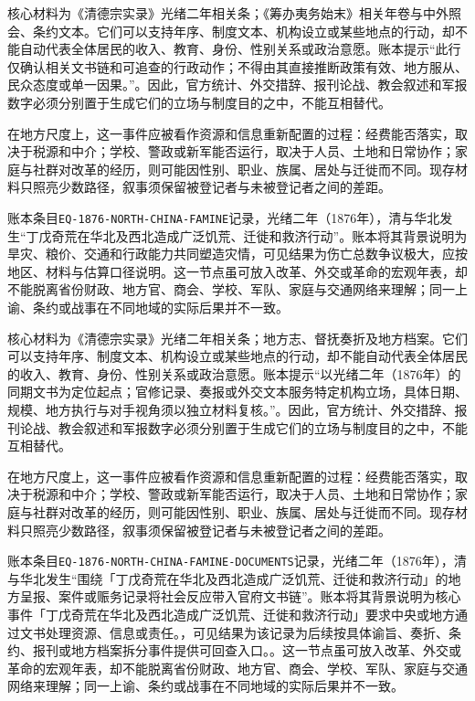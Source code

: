 核心材料为《清德宗实录》光绪二年相关条；《筹办夷务始末》相关年卷与中外照会、条约文本。它们可以支持年序、制度文本、机构设立或某些地点的行动，却不能自动代表全体居民的收入、教育、身份、性别关系或政治意愿。账本提示“此行仅确认相关文书链和可追查的行政动作；不得由其直接推断政策有效、地方服从、民众态度或单一因果。”。因此，官方统计、外交措辞、报刊论战、教会叙述和军报数字必须分别置于生成它们的立场与制度目的之中，不能互相替代。

在地方尺度上，这一事件应被看作资源和信息重新配置的过程：经费能否落实，取决于税源和中介；学校、警政或新军能否运行，取决于人员、土地和日常协作；家庭与社群对改革的经历，则可能因性别、职业、族属、居处与迁徙而不同。现存材料只照亮少数路径，叙事须保留被登记者与未被登记者之间的差距。

账本条目\texttt{EQ-1876-NORTH-CHINA-FAMINE}记录，光绪二年（1876年），清与华北发生“丁戊奇荒在华北及西北造成广泛饥荒、迁徙和救济行动”。账本将其背景说明为旱灾、粮价、交通和行政能力共同塑造灾情，可见结果为伤亡总数争议极大，应按地区、材料与估算口径说明。这一节点虽可放入改革、外交或革命的宏观年表，却不能脱离省份财政、地方官、商会、学校、军队、家庭与交通网络来理解；同一上谕、条约或战事在不同地域的实际后果并不一致。

核心材料为《清德宗实录》光绪二年相关条；地方志、督抚奏折及地方档案。它们可以支持年序、制度文本、机构设立或某些地点的行动，却不能自动代表全体居民的收入、教育、身份、性别关系或政治意愿。账本提示“以光绪二年（1876年）的同期文书为定位起点；官修记录、奏报或外交文本服务特定机构立场，具体日期、规模、地方执行与对手视角须以独立材料复核。”。因此，官方统计、外交措辞、报刊论战、教会叙述和军报数字必须分别置于生成它们的立场与制度目的之中，不能互相替代。

在地方尺度上，这一事件应被看作资源和信息重新配置的过程：经费能否落实，取决于税源和中介；学校、警政或新军能否运行，取决于人员、土地和日常协作；家庭与社群对改革的经历，则可能因性别、职业、族属、居处与迁徙而不同。现存材料只照亮少数路径，叙事须保留被登记者与未被登记者之间的差距。

账本条目\texttt{EQ-1876-NORTH-CHINA-FAMINE-DOCUMENTS}记录，光绪二年（1876年），清与华北发生“围绕「丁戊奇荒在华北及西北造成广泛饥荒、迁徙和救济行动」的地方呈报、案件或赈务记录将社会反应带入官府文书链”。账本将其背景说明为核心事件「丁戊奇荒在华北及西北造成广泛饥荒、迁徙和救济行动」要求中央或地方通过文书处理资源、信息或责任。，可见结果为该记录为后续按具体谕旨、奏折、条约、报刊或地方档案拆分事件提供可回查入口。。这一节点虽可放入改革、外交或革命的宏观年表，却不能脱离省份财政、地方官、商会、学校、军队、家庭与交通网络来理解；同一上谕、条约或战事在不同地域的实际后果并不一致。

